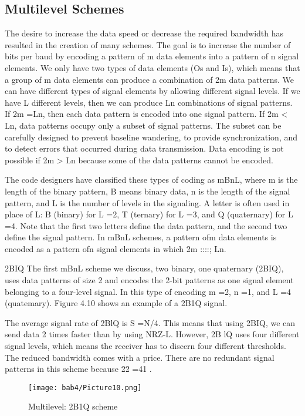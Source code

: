 \subsection*{Multilevel Schemes}
The desire to increase the data speed or decrease the required bandwidth has resulted in the creation of many schemes. The goal is to increase the number of bits per baud by encoding a pattern of m data elements into a pattern of n signal elements. We only have two types of data elements (Os and Is), which means that a group of m data elements can produce a combination of 2m data patterns. We can have different types of signal elements by allowing different signal levels. If we have L different levels, then we can produce Ln combinations of signal patterns. If 2m =Ln, then each data pattern is encoded into one signal pattern. If 2m < Ln, data patterns occupy only a subset of signal patterns. The subset can be carefully designed to prevent baseline wandering, to provide synchronization, and to detect errors that occurred during data transmission. Data encoding is not possible if 2m > Ln because some of the data patterns cannot be encoded.

The code designers have classified these types of coding as mBnL, where m is the length of the binary pattern, B means binary data, n is the length of the signal pattern, and L is the number of levels in the signaling. A letter is often used in place of L: B (binary) for L =2, T (ternary) for L =3, and Q (quaternary) for L =4. Note that the first two letters define the data pattern, and the second two define the signal pattern. In mBnL schemes, a pattern ofm data elements is encoded as a pattern ofn signal elements in which 2m ::::; Ln.

2BIQ The first mBnL scheme we discuss, two binary, one quaternary (2BIQ), uses data patterns of size 2 and encodes the 2-bit patterns as one signal element belonging to a four-level signal. In this type of encoding m =2, n =1, and L =4 (quatemary). Figure 4.10 shows an example of a 2B1Q signal.

The average signal rate of 2BlQ is S =N/4. This means that using 2BIQ, we can send data 2 times faster than by using NRZ-L. However, 2B lQ uses four different signal levels, which means the receiver has to discern four different thresholds. The reduced bandwidth comes with a price. There are no redundant signal patterns in this scheme because 22 =41 .

\begin{figure}
  \centering
  \texttt{[image: bab4/Picture10.png]}
  \caption{Multilevel: 2B1Q scheme}
  \label{fig4:10}
\end{figure}

